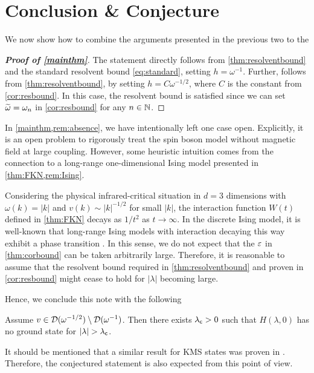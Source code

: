 \documentclass[a4paper,12pt,oneside]{article}
\begin{document}
\section{Conclusion \& Conjecture}\label{sec:outlook}

We now show how to combine the arguments presented in the previous two  to the
\begin{proof}[\textbf{Proof of \cref{mainthm}}]
	The statement  directly follows from \cref{thm:resolventbound} and the standard resolvent bound \cref{eq:standard}, setting $h=\omega^{-1}$. Further,  follows from \cref{thm:resolventbound}, by setting $h=C\omega^{-1/2}$, where $C$ is the constant from \cref{cor:resbound}. In this case, the resolvent bound is satisfied since we can set $\widetilde{\omega}=\omega_n$ in \cref{cor:resbound} for any $n\in{\mathbb N}$.
\end{proof}

In \cref{mainthm,rem:absence}, we have intentionally left one case open. Explicitly, it is an open problem to rigorously treat the spin boson model without magnetic field at large coupling. However, some heuristic intuition comes from the connection to a long-range one-dimensional Ising model presented in \cref{thm:FKN,rem:Ising}. 

Considering the physical infrared-critical situation in $d=3$ dimensions with $\omega(k)=|k|$ and $v(k)\sim |k|^{-1/2}$ for small $|k|$, the interaction function $W(t)$ defined in \cref{thm:FKN} decays as $1/t^2$ as $t\to\infty$. In the discrete Ising model, it is well-known that long-range Ising models with interaction decaying this way exhibit a phase transition \cite{AizenmanChayesChayesNewman.1980,ImbrieNewman.1988}. In this sense, we do not expect that the $\varepsilon$ in \cref{thm:corbound} can be taken arbitrarily large. Therefore, it is reasonable to assume that the resolvent bound required in \cref{thm:resolventbound} and proven in \cref{cor:resbound} might cease to hold for $|\lambda|$ becoming large.

Hence, we conclude this note with the following
\begin{conj}
	Assume $v\in{\mathcal D}(\omega^{-1/2})\setminus{\mathcal D}(\omega^{-1})$. Then there exists $\lambda_{\mathsf c}>0$ such that $H(\lambda,0)$ has no ground state for $|\lambda|>\lambda_\sfc$.
\end{conj}
	It should be mentioned that a similar result for KMS states was proven in \cite{Spohn.1989}. Therefore, the conjectured statement is also expected from this point of view.






\end{document}
